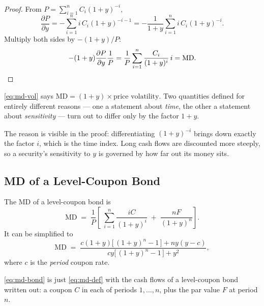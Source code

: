\suppstart
\begin{proof}
	From $P=\sum_{i=1}^{n} C_{i}(1+y)^{-i}$,
	\[
		\frac{\partial P}{\partial y}
		= -\sum_{i=1}^{n} i\,C_{i}(1+y)^{-i-1}
		= -\frac{1}{1+y}\sum_{i=1}^{n} i\,C_{i}(1+y)^{-i} .
	\]
	Multiply both sides by $-(1+y)/P$:
	\[
		-(1+y)\frac{\partial P}{\partial y}\frac{1}{P}
		= \frac{1}{P}\sum_{i=1}^{n}\frac{C_{i}}{(1+y)^{i}}\,i
		= \mathrm{MD}. \qedhere
	\]
\end{proof}

\begin{intuition}
	\eqref{eq:md-vol} says $\mathrm{MD} = (1+y) \times \text{price volatility}$.
	Two quantities defined for entirely different reasons --- one a statement about \emph{time}, the other a statement about \emph{sensitivity} --- turn out to differ only by the factor $1+y$.

	The reason is visible in the proof: differentiating $(1+y)^{-i}$ brings down exactly the factor $i$, which is the time index.
	Long cash flows are discounted more steeply, so a security's sensitivity to $y$ is governed by how far out its money sits.
\end{intuition}
\suppend

\subsection{MD of a Level-Coupon Bond}


\begin{proposition}
	The MD of a level-coupon bond is
	\begin{equation}
		\mathrm{MD} \;=\; \frac{1}{P}\left[\;\sum_{i=1}^{n}\frac{iC}{(1+y)^{i}} \;+\; \frac{nF}{(1+y)^{n}}\right]. \label{eq:md-bond}
	\end{equation}
	It can be simplified to
	\begin{equation}
		\mathrm{MD} \;=\; \frac{c(1+y)\bigl[\,(1+y)^{n}-1\,\bigr] + ny(y-c)}
		{cy\bigl[\,(1+y)^{n}-1\,\bigr] + y^{2}} , \label{eq:md-bond-closed}
	\end{equation}
	where $c$ is the \emph{period} coupon rate.
\end{proposition}

\suppstart
\eqref{eq:md-bond} is just \eqref{eq:md-def} with the cash flows of a level-coupon bond written out: a coupon $C$ in each of periods $1,\dots,n$, plus the par value $F$ at period $n$.

